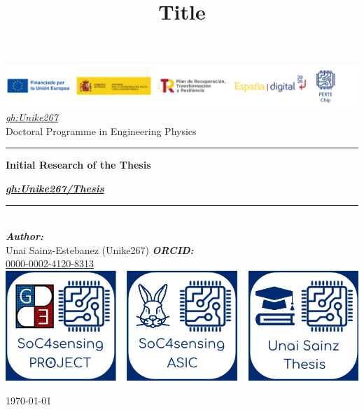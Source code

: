 
\newcommand{\gh}{\href{https://github.com/Unike267}{gh:Unike267}}
\newcommand{\type}{Doctoral Programme in Engineering Physics}
\newcommand{\titulo}{Initial Research of the Thesis} %
\title{Title}
\newcommand{\subtitle}{\textit{\href{https://github.com/Unike267/Thesis}{gh:Unike267/Thesis}}}

\begin{center}\leavevmode
    \normalfont
    \includegraphics[width=1.05 \columnwidth]{figures/logos_perte.png}
    \vskip 10mm 
    \textit{\Large \gh}\\[1 cm]
    {\large \type}
    \vskip 5mm
    \rule{\linewidth}{0.2 mm}
    {\huge \bfseries \titulo \par}
    \vskip 5mm
    {\Large \bfseries \subtitle \par}
    \rule{\linewidth}{0.2 mm}\\[1.5 cm]
    \large
	\emph{\textbf{Author:}}\\
    Unai Sainz-Estebanez (Unike267)
    \vskip 5mm
	\emph{\textbf{ORCID:}}\\
    \href{https://orcid.org/0000-0002-4120-8313}{0000-0002-4120-8313}
    \vskip 20mm 
    \includegraphics[width=0.75 \columnwidth]{figures/All_SoC4sen_logo.png}
    \vfill
    {\normalsize \today \par}
\end{center}
\cleardoublepage
